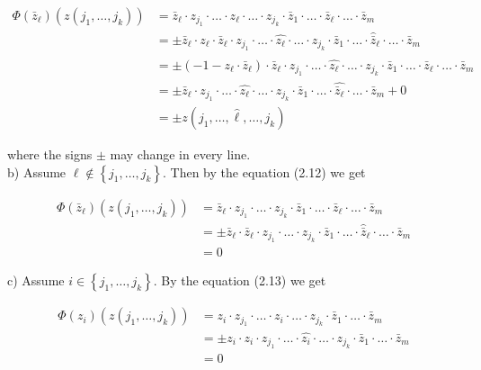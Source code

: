 \documentclass[10pt, letterpaper]{article}
\begin{document}
$$
\begin{aligned}
\Phi\left(\bar{z}_{\ell}\right)\left(z\left(j_{1}, \ldots, j_{k}\right)\right) & =\bar{z}_{\ell} \cdot z_{j_{1}} \cdot \ldots \cdot z_{\ell} \cdot \ldots \cdot z_{j_{k}} \cdot \bar{z}_{1} \cdot \ldots \cdot \bar{z}_{\ell} \cdot \ldots \cdot \bar{z}_{m} \\
& = \pm \bar{z}_{\ell} \cdot z_{\ell} \cdot \bar{z}_{\ell} \cdot z_{j_{1}} \cdot \ldots \cdot \widehat{z_{\ell}} \cdot \ldots \cdot z_{j_{k}} \cdot \bar{z}_{1} \cdot \ldots \cdot \widehat{\bar{z}}_{\ell} \cdot \ldots \cdot \bar{z}_{m} \\
& = \pm\left(-1-z_{\ell} \cdot \bar{z}_{\ell}\right) \cdot \bar{z}_{\ell} \cdot z_{j_{1}} \cdot \ldots \cdot \widehat{z_{\ell}} \cdot \ldots \cdot z_{j_{k}} \cdot \bar{z}_{1} \cdot \ldots \cdot \widehat{\bar{z}_{\ell}} \cdot \ldots \cdot \bar{z}_{m} \\
& = \pm \bar{z}_{\ell} \cdot z_{j_{1}} \cdot \ldots \cdot \widehat{z_{\ell}} \cdot \ldots \cdot z_{j_{k}} \cdot \bar{z}_{1} \cdot \ldots \cdot \widehat{\bar{z}_{\ell}} \cdot \ldots \cdot \bar{z}_{m}+0 \\
& = \pm z\left(j_{1}, \ldots, \widehat{\ell}, \ldots, j_{k}\right)
\end{aligned}
$$

where the signs $\pm$ may change in every line.\\
b) Assume $\ell \notin\left\{j_{1}, \ldots, j_{k}\right\}$. Then by the equation (2.12) we get

$$
\begin{aligned}
\Phi\left(\bar{z}_{\ell}\right)\left(z\left(j_{1}, \ldots, j_{k}\right)\right) & =\bar{z}_{\ell} \cdot z_{j_{1}} \cdot \ldots \cdot z_{j_{k}} \cdot \bar{z}_{1} \cdot \ldots \cdot \bar{z}_{\ell} \cdot \ldots \cdot \bar{z}_{m} \\
& = \pm \bar{z}_{\ell} \cdot \bar{z}_{\ell} \cdot z_{j_{1}} \cdot \ldots \cdot z_{j_{k}} \cdot \bar{z}_{1} \cdot \ldots \cdot \widehat{\bar{z}}_{\ell} \cdot \ldots \cdot \bar{z}_{m} \\
& =0
\end{aligned}
$$

c) Assume $i \in\left\{j_{1}, \ldots, j_{k}\right\}$. By the equation (2.13) we get

$$
\begin{aligned}
\Phi\left(z_{i}\right)\left(z\left(j_{1}, \ldots, j_{k}\right)\right) & =z_{i} \cdot z_{j_{1}} \cdot \ldots \cdot z_{i} \cdot \ldots \cdot z_{j_{k}} \cdot \bar{z}_{1} \cdot \ldots \cdot \bar{z}_{m} \\
& = \pm z_{i} \cdot z_{i} \cdot z_{j_{1}} \cdot \ldots \cdot \widehat{z_{i}} \cdot \ldots \cdot z_{j_{k}} \cdot \bar{z}_{1} \cdot \ldots \cdot \bar{z}_{m} \\
& =0
\end{aligned}
$$
\end{document}
